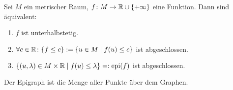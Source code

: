 \begin{lemma}
Sei $M$ ein metrischer Raum, $f\colon M\to\mathbb{R}\cup\lbrace+\infty\rbrace$ eine Funktion. Dann sind äquivalent: 
\begin{enumerate}[label=(\roman*)]
	\item $f$ ist unterhalbstetig.
	\item $\forall c\in\mathbb{R}\colon\lbrace f\leq c\rbrace:=\lbrace u\in M\mid f(u)\leq c\rbrace$ ist abgeschlossen.
	\item $\lbrace(u,\lambda)\in M\times\mathbb{R}\mid f(u)\leq\lambda\rbrace=:\operatorname{epi}(f)$ ist abgeschlossen.
\end{enumerate}
\end{lemma}

\begin{bemerkung}
Der Epigraph ist die Menge aller Punkte über dem Graphen.
\end{bemerkung}

